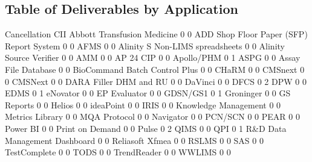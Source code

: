 \documentclass{article}
\begin{document}
\subsection{Table of Deliverables by Application}
\begin{Schunk}
\begin{Soutput}
                                           Cancellation CII
  Abbott Transfusion Medicine                         0   0
  ADD Shop Floor Paper (SFP) Report System            0   0
  AFMS                                                0   0
  Alinity S Non-LIMS spreadsheets                     0   0
  Alinity Source Verifier                             0   0
  AMM                                                 0   0
  AP 24 CIP                                           0   0
  Apollo/PHM                                          0   1
  ASPG                                                0   0
  Assay File Database                                 0   0
  BioCommand Batch Control Plus                       0   0
  CHaRM                                               0   0
  CMSnext                                             0   0
  CMSNext                                             0   0
  DARA Filler DHM and RU                              0   0
  DaVinci                                             0   0
  DFCS                                                0   2
  DPW                                                 0   0
  EDMS                                                0   1
  eNovator                                            0   0
  EP Evaluator                                        0   0
  GDSN/GS1                                            0   1
  Groninger                                           0   0
  GS Reports                                          0   0
  Helios                                              0   0
  ideaPoint                                           0   0
  IRIS                                                0   0
  Knowledge Management                                0   0
  Metrics Library                                     0   0
  MQA Protocol                                        0   0
  Navigator                                           0   0
  PCN/SCN                                             0   0
  PEAR                                                0   0
  Power BI                                            0   0
  Print on Demand                                     0   0
  Pulse                                               0   2
  QIMS                                                0   0
  QPI                                                 0   1
  R&D Data Management Dashboard                       0   0
  Reliasoft Xfmea                                     0   0
  RSLMS                                               0   0
  SAS                                                 0   0
  TestComplete                                        0   0
  TODS                                                0   0
  TrendReader                                         0   0
  WWLIMS                                              0   0
                                          

\end{Soutput}
\end{Schunk}
\end{document}

